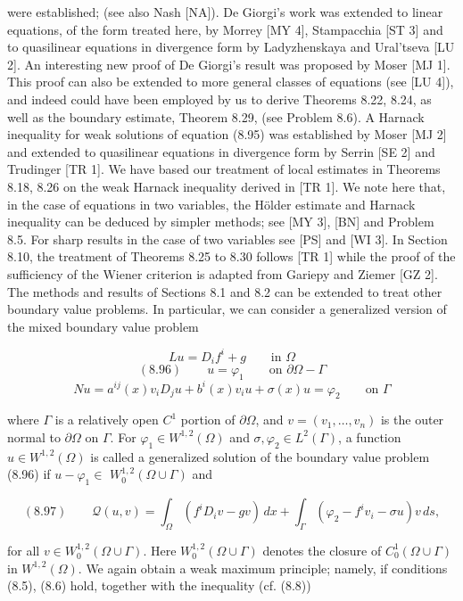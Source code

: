 were established; (see also Nash [NA]). De Giorgi's work was extended to linear
equations, of the form treated here, by Morrey [MY 4], Stampacchia [ST 3] and
to quasilinear equations in divergence form by Ladyzhenskaya and Ural'tseva [LU
2]. An interesting new proof of De Giorgi's result was proposed by Moser [MJ 1].
This proof can also be extended to more general classes of equations (see [LU 4]),
and indeed could have been employed by us to derive Theorems 8.22, 8.24, as well
as the boundary estimate, Theorem 8.29, (see Problem 8.6). A Harnack inequality
for weak solutions of equation (8.95) was established by Moser [MJ 2] and extended
to quasilinear equations in divergence form by Serrin [SE 2] and Trudinger [TR 1].
We have based our treatment of local estimates in Theorems 8.18, 8.26 on the weak
Harnack inequality derived in [TR 1]. We note here that, in the case of equations in
two variables, the Hölder estimate and Harnack inequality can be deduced by
simpler methods; see [MY 3], [BN] and Problem 8.5. For sharp results in the case
of two variables see [PS] and [WI 3]. In Section 8.10, the treatment of Theorems
8.25 to 8.30 follows [TR 1] while the proof of the sufficiency of the Wiener criterion
is adapted from Gariepy and Ziemer [GZ 2].
The methods and results of Sections 8.1 and 8.2 can be extended to treat other
boundary value problems. In particular, we can consider a generalized version of
the mixed boundary value problem

\[
Lu = D_i f^i + g \qquad \text{in } \Omega
\]
\[
(8.96)\qquad u=\varphi_1 \qquad \text{on } \partial\Omega-\Gamma
\]
\[
Nu=a^{ij}(x)v_iD_j u+b^i(x)v_i u+\sigma(x)u=\varphi_2 \qquad \text{on } \Gamma
\]

where $\Gamma$ is a relatively open $C^1$ portion of $\partial\Omega$, and $v=(v_1,\ldots,v_n)$ is the outer
normal to $\partial\Omega$ on $\Gamma$. For $\varphi_1\in W^{1,2}(\Omega)$ and $\sigma,\varphi_2\in L^2(\Gamma)$, a function $u\in W^{1,2}(\Omega)$
is called a generalized solution of the boundary value problem (8.96) if $u-\varphi_1\in$
$W^{1,2}_0(\Omega\cup\Gamma)$ and

\[
(8.97)\qquad \mathcal{Q}(u,v)=\int_{\Omega}(f^iD_i v-gv)\,dx+\int_{\Gamma}(\varphi_2-f^i v_i-\sigma u)v\,ds,
\]

for all $v\in W^{1,2}_0(\Omega\cup\Gamma)$. Here $W^{1,2}_0(\Omega\cup\Gamma)$ denotes the closure of $C^1_0(\Omega\cup\Gamma)$ in $W^{1,2}(\Omega)$. We again obtain a weak maximum principle; namely, if conditions (8.5), (8.6) hold, together with the inequality (cf. (8.8))

